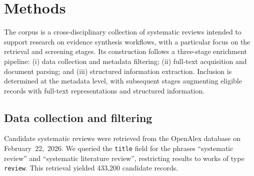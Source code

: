 \section*{Methods}

The corpus is a cross-disciplinary collection of systematic reviews intended to support research on evidence synthesis workflows, with a particular focus on the retrieval and screening stages. Its construction follows a three-stage enrichment pipeline: (i) data collection and metadata filtering; (ii) full-text acquisition and document parsing; and (iii) structured information extraction. Inclusion is determined at the metadata level, with subsequent stages augmenting eligible records with full-text representations and structured information.

\subsection*{Data collection and filtering}
Candidate systematic reviews were retrieved from the OpenAlex database on February~22,~2026. We queried the \texttt{title} field for the phrases ``systematic review'' and ``systematic literature review'', restricting results to works of type \texttt{review}. This retrieval yielded 433,200 candidate records.


